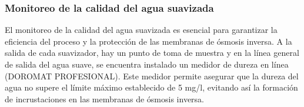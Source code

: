 \subsubsection{Monitoreo de la calidad del agua suavizada}

El monitoreo de la calidad del agua suavizada es esencial para garantizar la eficiencia del proceso y la protección de las membranas de ósmosis inversa. A la salida de cada suavizador, hay un punto de toma de muestra y en la línea general de salida del agua suave, se encuentra instalado un medidor de dureza en línea (DOROMAT PROFESIONAL). Este medidor permite asegurar que la dureza del agua no supere el límite máximo establecido de 5 mg/l, evitando así la formación de incrustaciones en las membranas de ósmosis inversa.
